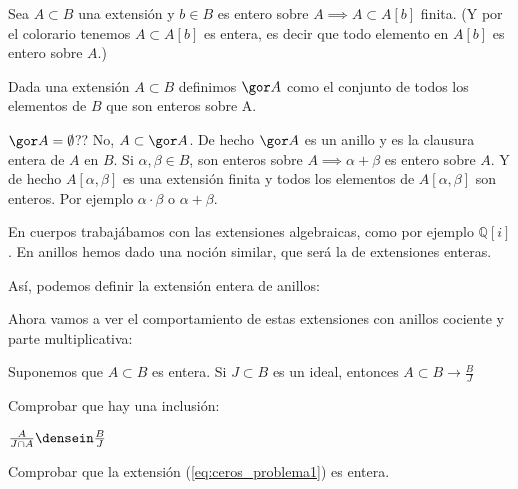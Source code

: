 \obs Sea $A \subset B$ una extensión y $b \in B$ es entero sobre $A \implies A \subset A[b]$ finita. (Y por el colorario tenemos $A\subset A[b]$ es entera, es decir que todo elemento en $A[b]$ es entero sobre $A$.)

\begin{defn}
	Dada una extensión $A \subset B$ definimos $\cls{A}$ como el conjunto de todos los elementos de $B$ que son enteros sobre A.
\end{defn}

\obs $\cls{A}=\emptyset$?? No, $A \subset \cls{A}$. De hecho $\cls{A}$ es un anillo y es la clausura entera de $A$ en $B$. Si $\alpha, \beta \in B$, son enteros sobre $A \implies \alpha + \beta$ es entero sobre $A$. Y de hecho $A[\alpha, \beta]$ es una extensión finita y todos los elementos de $A[\alpha, \beta]$ son enteros. Por ejemplo $\alpha \cdot \beta$ o $\alpha + \beta$.



	En cuerpos trabajábamos con las extensiones algebraicas, como por ejemplo $ℚ[i]$. En anillos hemos dado una noción similar, que será la de extensiones enteras.



	Así, podemos definir la extensión entera de anillos:


	Ahora vamos a ver el comportamiento de estas extensiones con anillos cociente y parte multiplicativa:

	\begin{problem}
		Suponemos que $A \subset B$ es entera.
		Si $J \subset B$ es un ideal, entonces $A \subset B \rightarrow \frac{B}{J}$

		\ppart Comprobar que hay una inclusión:

		\( \frac{A}{J \cap A} \densein \frac{B}{J} \label{eq:ceros_problema1}\)

		\ppart Comprobar que la extensión (\ref{eq:ceros_problema1}) es entera.

		\solution
	\end{problem}

